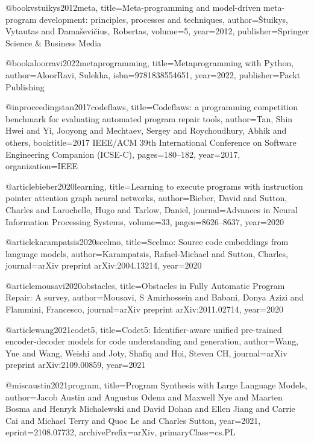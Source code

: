 
@book{vstuikys2012meta,
  title={Meta-programming and model-driven meta-program development: principles, processes and techniques},
  author={{\v{S}}tuikys, Vytautas and Dama{\v{s}}evi{\v{c}}ius, Robertas},
  volume={5},
  year={2012},
  publisher={Springer Science \& Business Media}
}

@book{aloorravi2022metaprogramming,
  title={Metaprogramming with Python},
  author={AloorRavi, Sulekha},
  isbn={9781838554651},
  year={2022},
  publisher={Packt Publishing}
}



@inproceedings{tan2017codeflaws,
  title={Codeflaws: a programming competition benchmark for evaluating automated program repair tools},
  author={Tan, Shin Hwei and Yi, Jooyong and Mechtaev, Sergey and Roychoudhury, Abhik and others},
  booktitle={2017 IEEE/ACM 39th International Conference on Software Engineering Companion (ICSE-C)},
  pages={180--182},
  year={2017},
  organization={IEEE}
}


@article{bieber2020learning,
  title={Learning to execute programs with instruction pointer attention graph neural networks},
  author={Bieber, David and Sutton, Charles and Larochelle, Hugo and Tarlow, Daniel},
  journal={Advances in Neural Information Processing Systems},
  volume={33},
  pages={8626--8637},
  year={2020}
}

@article{karampatsis2020scelmo,
  title={Scelmo: Source code embeddings from language models},
  author={Karampatsis, Rafael-Michael and Sutton, Charles},
  journal={arXiv preprint arXiv:2004.13214},
  year={2020}
}

@article{mousavi2020obstacles,
  title={Obstacles in Fully Automatic Program Repair: A survey},
  author={Mousavi, S Amirhossein and Babani, Donya Azizi and Flammini, Francesco},
  journal={arXiv preprint arXiv:2011.02714},
  year={2020}
}


@article{wang2021codet5,
  title={Codet5: Identifier-aware unified pre-trained encoder-decoder models for code understanding and generation},
  author={Wang, Yue and Wang, Weishi and Joty, Shafiq and Hoi, Steven CH},
  journal={arXiv preprint arXiv:2109.00859},
  year={2021}
}

@misc{austin2021program,
      title={Program Synthesis with Large Language Models},
      author={Jacob Austin and Augustus Odena and Maxwell Nye and Maarten Bosma and Henryk Michalewski and David Dohan and Ellen Jiang and Carrie Cai and Michael Terry and Quoc Le and Charles Sutton},
      year={2021},
      eprint={2108.07732},
      archivePrefix={arXiv},
      primaryClass={cs.PL}
}



